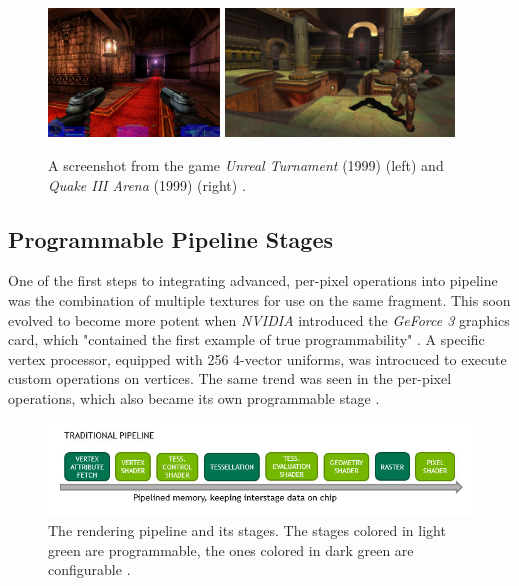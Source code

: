 \begin{figure}[h]
    \centering
    \includegraphics[width=172.5px]{images/graphics/unreal-turnament.jpg}
    \includegraphics[width=230px]{images/graphics/quake-iii-arena.jpg}
    \caption{A screenshot from the game \emph{Unreal Turnament} (1999) (left) and \emph{Quake III Arena} (1999) 
    (right) \cite{GamespotUnrealTurnament, GameWatcher2006}.}
    \label{fig:unreal-turnament-quake-arena}
\end{figure}


\subsection{Programmable Pipeline Stages}
 
One of the first steps to integrating advanced, per-pixel operations into pipeline was the combination of
multiple textures for use on the same fragment. This soon evolved to become more potent when \emph{NVIDIA} 
introduced the \emph{GeForce 3} graphics card, which "contained the first example of true programmability" 
\cite{KhronosProgramibility2024}. A specific vertex processor, equipped with 256 4-vector uniforms, was 
introcuced to execute custom operations on vertices. The same trend was seen in the per-pixel operations, 
which also became its own programmable stage \cite{KhronosProgramibility2024}. \\

\begin{figure}[h]
    \centering
    \includegraphics[width=\linewidth]{images/graphics/traditional-rendering-pipeline.jpg}
    \caption{The rendering pipeline and its stages. The stages colored in light green are programmable, 
    the ones colored in dark green are configurable \cite{Kubisch2018}.}
    \label{fig:traditional-rendering-pipeline}
\end{figure}

